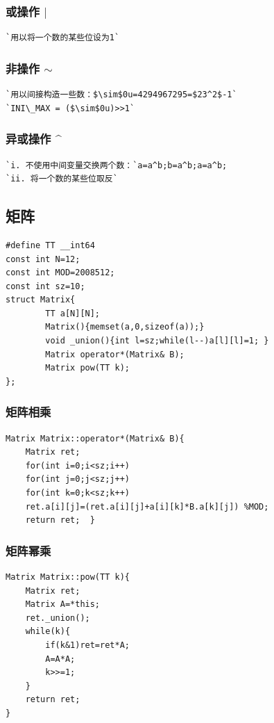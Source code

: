 \documentclass[a4paper]{article}
\begin{document}
\begin{CJK*}{UTF8}{gbsn}
\begin{multicols}{3}
\begin{flushleft}
\subsubsection{或操作 $|$}
\begin{lstlisting}
`用以将一个数的某些位设为1`
\end{lstlisting}

\subsubsection{非操作 $\sim$ }
\begin{lstlisting}
`用以间接构造一些数：$\sim$0u=4294967295=$23^2$-1`
`INI\_MAX = ($\sim$0u)>>1`
\end{lstlisting}


\subsubsection{异或操作 \^{}}
\begin{lstlisting}
`i. 不使用中间变量交换两个数：`a=a^b;b=a^b;a=a^b;
`ii. 将一个数的某些位取反`
\end{lstlisting}



\subsection{矩阵}
\begin{lstlisting}
#define TT __int64
const int N=12;
const int MOD=2008512;
const int sz=10;
struct Matrix{
		TT a[N][N];	
		Matrix(){memset(a,0,sizeof(a));}
		void _union(){int l=sz;while(l--)a[l][l]=1; }
		Matrix operator*(Matrix& B);
		Matrix pow(TT k); 
}; 
\end{lstlisting}


\subsubsection{矩阵相乘}
\begin{lstlisting}
Matrix Matrix::operator*(Matrix& B){
	Matrix ret;
	for(int i=0;i<sz;i++)
	for(int j=0;j<sz;j++)
	for(int k=0;k<sz;k++)
	ret.a[i][j]=(ret.a[i][j]+a[i][k]*B.a[k][j]) %MOD;
	return ret;  } 
\end{lstlisting}

\subsubsection{矩阵幂乘}
\begin{lstlisting}
Matrix Matrix::pow(TT k){
	Matrix ret;
	Matrix A=*this;
	ret._union();
	while(k){
		if(k&1)ret=ret*A;
		A=A*A;
		k>>=1; 
	}
	return ret; 
}
\end{lstlisting}


\end{flushleft}
\end{multicols}
\end{CJK*}
\end{document}
